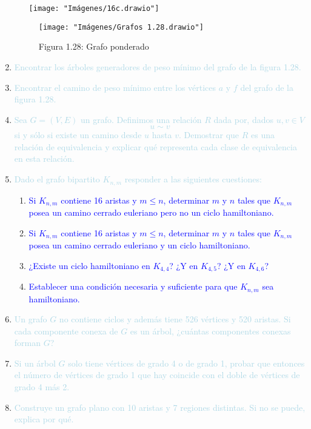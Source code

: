 \documentclass[12pt]{article}
\newcommand{\lb}[1]{\textcolor{lightblue}{#1}}
\newcommand{\db}[1]{\textcolor{blue}{#1}}
\begin{document}
\begin{enumerate}[label=\color{red}\textbf{\arabic*)},leftmargin=*]
\begin{enumerate}[label=\color{red}\alph*)]
\texttt{[image: "Imágenes/16c.drawio"]}
	\end{enumerate}
	\begin{figure}[h]
		\centering
		\texttt{[image: "Imágenes/Grafos 1.28.drawio"]}
		\caption*{Figura 1.28: Grafo ponderado}
	\end{figure}
	\item \lb{Encontrar los árboles generadores de peso mínimo del grafo de la figura 1.28.}
	\item \lb{Encontrar el camino de peso mínimo entre los vértices $a$ y $f$ del grafo de la figura 1.28.}
	\item \lb{Sea $G=(V,E)$ un grafo. Definimos una relación $R$ dada por, dados $u,v\in V$ \[ u\sim v \]si y sólo si existe un camino desde $u$ hasta $v$. Demostrar que $R$ es una relación de equivalencia y explicar qué representa cada clase de equivalencia en esta relación.}
	\item \lb{Dado el grafo bipartito $K_{n,m}$ responder a las siguientes cuestiones:}
	\begin{enumerate}[label=\color{red}\alph*)]
		\item \db{Si $K_{n,m}$ contiene 16 aristas y $m\le n$, determinar  $m$ y $n$ tales que $K_{n,m}$ posea un camino cerrado euleriano pero no un ciclo hamiltoniano.}
		\item \db{Si $K_{n,m}$ contiene 16 aristas y $m\le n$, determinar  $m$ y $n$ tales que $K_{n,m}$ posea un camino cerrado euleriano y un ciclo hamiltoniano.}
		\item \db{¿Existe un ciclo hamiltoniano en $K_{4,4}$? ¿Y en $K_{4,5}$? ¿Y en $K_{4,6}$?}
		\item \db{Establecer una condición necesaria y suficiente para que $K_{n,m}$ sea hamiltoniano.}
	\end{enumerate}
	\item \lb{Un grafo $G$ no contiene ciclos y además tiene 526 vértices y 520 aristas. Si cada componente conexa de $G$ es un árbol, ¿cuántas componentes conexas forman $G$?}
	\item \lb{Si un árbol $G$ solo tiene vértices de grado 4 o de grado 1, probar que entonces el número de vértices de grado 1 que hay coincide con el doble de vértices de grado 4 más 2.}
	\item \lb{Construye un grafo plano con 10 aristas y 7 regiones distintas. Si no se puede, explica por qué.}
\end{enumerate}
\newpage
\end{document}
